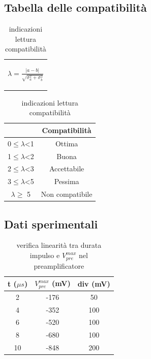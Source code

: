\documentclass{article}
\begin{document}
\subsection{Tabella delle compatibilità}
\medskip
\begin{table}[H]
    \centering
    \begin{tabular}{c}
        \begin{Large}
        $\lambda=\frac{|a-b|}{\sqrt{\sigma_a^2+\sigma_b^2}}$
        \end{Large}\\
    \end{tabular}
    \hspace{0.5cm}
    \begin{tabular}{cc}
        \toprule
        &       \textbf{Compatibilità   }       \\
        \midrule
        0$\leq \lambda$<1   &Ottima                 \\
        1$\leq \lambda$<2   &Buona                  \\
        2$\leq \lambda$<3   &Accettabile            \\
        3$\leq\lambda$<5   &Pessima                \\
        $ \lambda \geq $  5     &Non compatibile        \\
        \bottomrule
    \end{tabular}
    \caption{indicazioni lettura compatibilità}
    \label{tab:compatibilità}
\end{table}

\subsection{Dati sperimentali}

\begin{table}[H]
    \centering
    \begin{tabular}{ccc}
        \toprule
        t ($\mu s$) & $V_{pre}^{max}$ (mV) & div (mV) \\
        \midrule
        2 & -176 & 50 \\
        4 & -352 & 100 \\
        6 & -520 & 100 \\
        8 & -680 & 100 \\
        10 & -848 & 200 \\
        \bottomrule
    \end{tabular}
    \caption{verifica linearità tra durata impulso e $V_{pre}^{max}$ nel preamplificatore}
\end{table}
\end{document}
